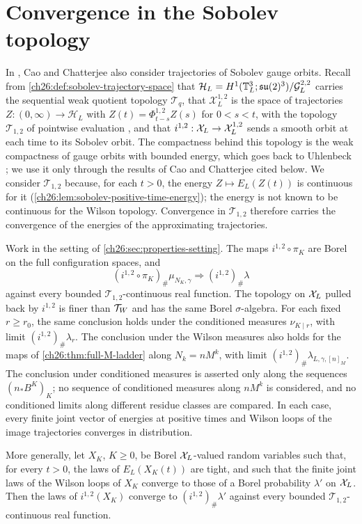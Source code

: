 \section{Convergence in the Sobolev topology}\label{ch26:sec:sobolev}

In \cite{CCState2023v4}, Cao and Chatterjee also consider trajectories of Sobolev gauge orbits. Recall from \cref{ch26:def:sobolev-trajectory-space} that $\mathcal H_L=H^1(\mathbb T_L^3;\mathfrak{su}(2)^3)/\mathcal G_L^{2,2}$ carries the sequential weak quotient topology $\mathcal T_q$, that $\mathcal X_L^{1,2}$ is the space of trajectories $Z:(0,\infty)\to\mathcal H_L$ with $Z(t)=\Phi^{1,2}_{t-s}Z(s)$ for $0<s<t$, with the topology $\mathcal T_{1,2}$ of pointwise evaluation \cite[Definition~3.70, p.~41]{CCState2023v4}, and that $i^{1,2}:\mathcal X_L\to\mathcal X_L^{1,2}$ sends a smooth orbit at each time to its Sobolev orbit. The compactness behind this topology is the weak compactness of gauge orbits with bounded energy, which goes back to Uhlenbeck \cite{Uhlenbeck1982Connections}; we use it only through the results of Cao and Chatterjee cited below. We consider $\mathcal T_{1,2}$ because, for each $t>0$, the energy $Z\mapsto E_L(Z(t))$ is continuous for it (\cref{ch26:lem:sobolev-positive-time-energy}); the energy is not known to be continuous for the Wilson topology. Convergence in $\mathcal T_{1,2}$ therefore carries the convergence of the energies of the approximating trajectories.

\begin{theorem}\label{ch26:thm:sobolev-image-limit}
Work in the setting of \cref{ch26:sec:properties-setting}. The maps $i^{1,2}\circ\pi_K$ are Borel on the full configuration spaces, and
\[
 (i^{1,2}\circ\pi_K)_\#\mu_{N_K,\gamma}\Longrightarrow(i^{1,2})_\#\lambda
\]
against every bounded $\mathcal T_{1,2}$-continuous real function. The topology on $\mathcal X_L$ pulled back by $i^{1,2}$ is finer than $\mathcal T_W$ and has the same Borel $\sigma$-algebra. For each fixed $r\ge r_0$, the same conclusion holds under the conditioned measures $\nu_{K\mid r}$, with limit $(i^{1,2})_\#\lambda_r$. The conclusion under the Wilson measures also holds for the maps of \cref{ch26:thm:full-M-ladder} along $N_k=nM^k$, with limit $(i^{1,2})_\#\lambda_{L,\gamma,[n]_M}$. The conclusion under conditioned measures is asserted only along the sequences $(n_*B^K)_K$; no sequence of conditioned measures along $nM^k$ is considered, and no conditioned limits along different residue classes are compared. In each case, every finite joint vector of energies at positive times and Wilson loops of the image trajectories converges in distribution.

More generally, let $X_K$, $K\ge0$, be Borel $\mathcal X_L$-valued random variables such that, for every $t>0$, the laws of $E_L(X_K(t))$ are tight, and such that the finite joint laws of the Wilson loops of $X_K$ converge to those of a Borel probability $\lambda'$ on $\mathcal X_L$. Then the laws of $i^{1,2}(X_K)$ converge to $(i^{1,2})_\#\lambda'$ against every bounded $\mathcal T_{1,2}$-continuous real function.
\end{theorem}

